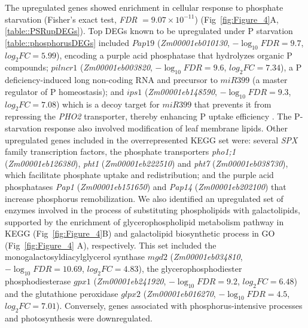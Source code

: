 \documentclass[9pt,twocolumn,twoside]{rilabRxiv}
\begin{document}
The upregulated genes showed enrichment in cellular response to phosphate starvation (Fisher's exact test, \textit{FDR} $=9.07 \times 10^{-11}$) (Fig~\ref{fig:Figure_4}A, \ref{table::PSRupDEGs}).
Top DEGs known to be upregulated under P starvation \ref{table::phosphorusDEGs} included $\textit{Pap19}$ (\textit{Zm00001eb010130}, $-\log_{10}{FDR}=9.7$, $log_2{FC}=5.99$), encoding a purple acid phosphatase that hydrolyzes organic P compounds;
$\textit{pilncr1}$ (\textit{Zm00001eb003820}, $-\log_{10}{FDR}=9.6$, $log_2{FC}=7.34$), a P deficiency-induced long non-coding $\text{RNA}$ and precursor to $\textit{miR399}$ (a master regulator of P homeostasis); and $\textit{ips1}$ (\textit{Zm00001eb148590}, $-\log_{10}{FDR}=9.3$, $log_2{FC}=7.08$) which  is a decoy target for $\textit{miR399}$ that prevents it from repressing the \textit{PHO2} transporter, thereby enhancing P uptake efficiency \cite{du2018}.
The P-starvation response also involved modification of leaf membrane lipids.
Other upregulated genes included in the overrepresented KEGG set were: several \textit{SPX} family transcription factors, the phosphate transporters \textit{pho1;1} (\textit{Zm00001eb126380}), \textit{pht1} (\textit{Zm00001eb222510}) and \textit{pht7} (\textit{Zm00001eb038730}), which facilitate phosphate uptake and redistribution; and the purple acid phosphatases \textit{Pap1} (\textit{Zm00001eb151650}) and \textit{Pap14} (\textit{Zm00001eb202100}) that increase phosphorus remobilization.
We also identified an upregulated set of enzymes involved in the process of substituting phospholipids with galactolipids, supported by the enrichment of glycerophospholipid metabolism pathway in KEGG (Fig~\ref{fig:Figure_4}B) and galactolipid biosynthetic process in GO (Fig~\ref{fig:Figure_4} A), respectively. 
This set included the monogalactosyldiacylglycerol synthase $\textit{mgd2}$ (\textit{Zm00001eb034810}, $-\log_{10}{FDR}=10.69$, $log_2{FC}=4.83$), the glycerophosphodiester phosphodiesterase $\textit{gpx1}$ (\textit{Zm00001eb241920}, $-\log_{10}{FDR}=9.2$, $log_2{FC}=6.48$) and the glutathione peroxidase $\textit{glpx2}$ (\textit{Zm00001eb016270}, $-\log_{10}{FDR}=4.5$, $log_2{FC}=7.01$). 
Conversely, genes associated with phosphorus-intensive processes and photosynthesis were downregulated.
\end{document}
